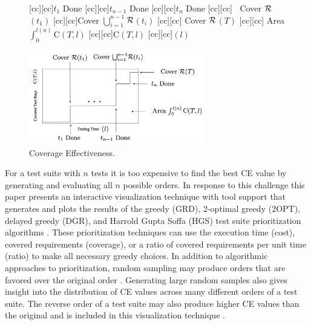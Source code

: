\documentclass{vgtc}                          %
\begin{document}
\begin{figure}[t]
\centering
{}[cc][cc]{$t_1$ Done}
[cc][cc]{$t_{n-1}$ Done}
[cc][cc]{$t_{n}$ Done}
[cc][cc]{$\;\;$ Cover $\cal{R}$$(t_1)$}
[cc][cc]{Cover $\bigcup_{i = 1}^{n-1}$$ \cal{R}$$(t_i)$}
[cc][cc]{\hspace{10pt} Cover $\cal{R}$$(T)$}
[cc][cc]{\hspace{10pt} Area $\int_0^{l(n)} \mathrm{C}(T, l)$}
[cc][cc]{${\scriptstyle \mathrm{C}(T,l)}$}
[cc][cc]{$(l)$}

\includegraphics[width=3in]{cum_cov_final.png}
\vspace{-.2in}
\caption{Coverage Effectiveness.} 
\vspace{-.25in}
\label{fig:ce}
\end{figure}	


For a test suite with $n$ tests it is too expensive to find the best CE value by generating  and evaluating all $n\!$ possible orders.  In response to this challenge this paper presents an interactive visualization technique with tool support that  generates and plots the results of the greedy (GRD), 2-optimal greedy (2OPT), delayed greedy (DGR), and Harrold Gupta Soffa (HGS) test suite prioritization algorithms \cite{smith:2009}.  These prioritization techniques can use the execution time (cost), covered requirements (coverage), or a ratio of covered requirements per unit time (ratio) to make all necessary greedy choices.  In addition to algorithmic approaches to prioritization, random sampling may produce orders that are favored over the original order \cite{hyunsook}. Generating large random samples also gives insight into the distribution of CE values across many different orders of a test suite.  The reverse order of a test suite may also produce higher CE values than the original and is included in this visualization technique \cite{smith:2009}.
\end{document}
